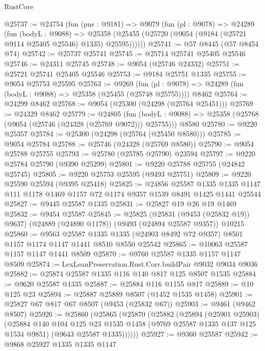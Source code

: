 \begin{lexlean}{RustCore}
\begin{coremodule}
@25737 := @24754
    (fun (pns : @9181) =>
    @9079
      (fun (pl : @9078) =>
      @24289
        (fun (bodyL : @9088) =>
        @25358 (@25455 (@25720 (@9054 (@9184 (@25721 @9114 @25405 @25546) @1335) @25595))))))
@25741 := @57 @8445 (@57 @8454 @74)
@25742 := @25737 @25741
@25745 := @25714 @25741 @25405 @25546
@25746 := @24311 @25745
@25748 := @9054 (@25746 @24332)
@25751 := @25721 @25741 @25405 @25546
@25753 := @9184 @25751 @1335
@25755 := @9054 @25753 @25595
@25763 := @9269
    (fun (pl : @9078) => @24289 (fun (bodyL : @9088) => @25358 (@25455 (@25748 @25755))))
    @8462
@25764 := @24299 @8462
@25768 := @9054 (@25300 (@24298 (@25764 @25451)))
@25769 := @24329 @8462
@25779 := @24805
    (fun (bodyL : @9088) => @25358 (@25768 (@9054 (@25746 (@24328 (@25769 @9072))) @25755)))
    @8580
@25780 := @9220 @25357
@25784 := @25300 (@24298 (@25764 (@25450 @8580)))
@25785 := @9054 @25784
@25788 := @25746 (@24328 (@25769 @8580))
@25790 := @9054 @25788 @25755
@25793 := @25780 (@25785 @25790) @23594
@25797 := @9220 @25784 @25790 (@9390 @25299)
@25801 := @9220 @25788 @25755 (@24842 @25745)
@25805 := @9220 @25753 @25595 (@9493 @25751)
@25809 := @9220 @25590 @25594 (@9395 @25418)
@25825 := @24856
    @25587
    @1335
    @1335
    @1147
    @111
    @1178
    @1469
    @1157
    @72
    @1174
    @9357
    @1539
    @8491
    @1425
    @1441
    @25544
@25827 := @9445 @25587 @1335
@25831 := @25827 @19 @26 @19 @1469
@25832 := @9454 @25587
@25845 := @25825
    (@25831 (@9453 (@25832 @19)) @9637)
    (@24889 (@24890 @1178))
    (@9493 (@24894 @25587 @9357))
    @10215
@25860 := @9563
    @25587
    @1335
    @1335
    (@24903 @8492 @72 @9357)
    @8501
    @1157
    @1174
    @1147
    @1441
    @8510
    @8550
    @25542
@25865 := @10063 @25587 @1157 @1147 @1441 @8509
@25870 := @9760 @25587 @1335 @1157 @1147 @8509
@25874 := LexLeanPreservation.Rust.Corr.buildPair @9032 @9034 @9036
@25882 := @25874 @25587 @1335 @116 @140 @817 @125 @8507 @1535
@25884 := @9620 @25587 @1335
@25887 := @25884 @116 @1155 @817
@25889 := @10 @125 @23
@25894 := @25887 @25889 @8507 (@1452 @1535 @1458)
@25901 := @25827 @67 @817 @67 @8507 (@9453 (@25832 @67))
@25903 := @9461 (@9462 @8507)
@25926 := @25860
    (@25865
      (@25870
        (@25882
          (@25894
            (@25901 @25903)
            (@25884
              @140
              @104
              @125
              @23
              @1535
              @1458
              (@9769 @25587 @1335 @137 @125 @1534 @9851)
              (@9643 @25587 @1335))))))
@25927 := @9360 @25587
@25942 := @9868
    @25927
    @1335
    @1335
    @1147

\end{coremodule}
\end{lexlean}
